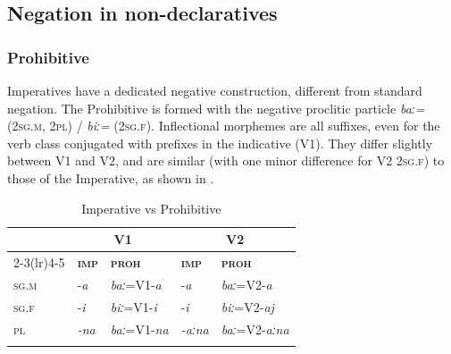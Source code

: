 \documentclass[output=paper,colorlinks,citecolor=brown]{langscibook}
\begin{document}

\subsection{Negation in non-declaratives}

\subsubsection{Prohibitive}
\label{sec:beja:2.2}
Imperatives have a dedicated negative construction, different from standard negation. The Prohibitive is formed with the negative proclitic particle \textit{baː=} (\textsc{2sg.m, 2pl}) / \textit{biː=} (\textsc{2sg.f}). Inflectional morphemes are all suffixes, even for the verb class conjugated with prefixes in the indicative (V1). They differ slightly between V1 and V2, and are similar (with one minor difference for V2 \textsc{2sg.f}) to those of the Imperative, as shown in .

\begin{table} 
\begin{tabularx}{.65\textwidth}{X ll ll}
\lsptoprule
& \multicolumn{2}{c}{{\bfseries V1}} & \multicolumn{2}{c}{{\bfseries V2}}\\
\cmidrule(lr){2-3}\cmidrule(lr){4-5}
& {\bfseries\scshape imp} & {\bfseries\scshape proh} & {\bfseries\scshape imp} & {\bfseries\scshape proh}\\
\midrule 
{\scshape sg.m} & {{}-\textit{a}} & {\textit{baː}=V1-\textit{a}} & {{}-\textit{a}} & {\textit{baː}=V2-\textit{a}}\\
{\scshape sg.f} & {{}-\textit{i}} & {\textit{biː}=V1-\textit{i}} & {{}-\textit{i}} & {\textit{biː}=V2-\textit{aj}}\\
{\scshape pl} & \textit{{}-na} & {\textit{baː}=V1-\textit{na}} & \textit{{}-aːna} & {\textit{baː}=V2-\textit{aːna}}\\
\lspbottomrule
\end{tabularx} 
\caption{Imperative vs Prohibitive}
\label{tab:beja:1}
\end{table}
\end{document}
